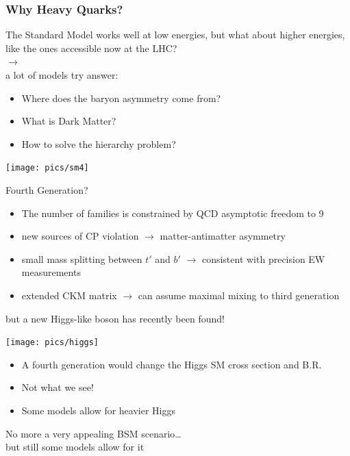 \documentclass[xcolor=dvipsnames,10pt]{beamer}
\begin{document}
\begin{frame}\frametitle{Why Heavy Quarks?}
\scriptsize\centering

\begin{minipage}{.35\textwidth}
\centering
The Standard Model works well at low energies, but what about \alert{higher energies}, like the ones accessible now at the LHC?\\
$\rightarrow$ \\
a lot of models try \alert{answer}:
\begin{itemize}
\item Where does the baryon asymmetry come from?
\item What is Dark Matter?
\item How to solve the hierarchy problem?
\end{itemize}


\texttt{[image: pics/sm4]}

\end{minipage}\begin{minipage}{.65\textwidth}
\centering

\alert{Fourth Generation?}~\cite{Holdom:2009rf,Cetin:2011aa}

\scriptsize
\begin{itemize}
\item The number of families is constrained by QCD asymptotic freedom to 9
\item new sources of CP violation $\rightarrow$ matter-antimatter asymmetry
\item small mass splitting between $t'$ and $b'$  $\rightarrow$ consistent with precision EW measurements
\item extended CKM matrix  $\rightarrow$ can assume maximal mixing to third generation
\end{itemize}

but a new Higgs-like boson has recently been found!~\cite{:2012gk}

\begin{minipage}{.6\textwidth}
\texttt{[image: pics/higgs]}

\end{minipage}\begin{minipage}{.4\textwidth}

\begin{itemize}
\item A fourth generation would change the Higgs SM cross section and B.R.
\item Not what we see!
\item Some models allow for heavier Higgs
\end{itemize}
\end{minipage}

No more a very appealing BSM scenario\dots\\ but still some models allow for it~\cite{Cetin:2011aa}

\end{minipage}

\end{frame}
\end{document}

